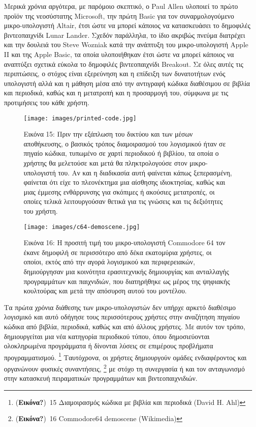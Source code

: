 \documentclass[
]{article}
\begin{document}
Μερικά χρόνια αργότερα, με παρόμοιο σκεπτικό, ο Paul Allen υλοποιεί το
πρώτο προϊόν της νεοσύστατης Microsoft, την πρώτη Basic για τον
συναρμολογούμενο μικρο-υπολογιστή Altair, έτσι ώστε να μπορεί κάποιος να
κατασκευάσει το δημοφιλές βιντεοπαιχνίδι Lunar Lander. Σχεδόν παράλληλα,
το ίδιο ακριβώς πνεύμα διατρέχει και την δουλειά του Steve Wozniak κατά
την ανάπτυξη του μικρο-υπολογιστή Apple II και της Apple Basic, τα οποία
υλοποιήθηκαν έτσι ώστε να μπορεί κάποιος να αναπτύξει σχετικά εύκολα το
δημοφιλές βιντεοπαιχνίδι Breakout. Σε όλες αυτές τις περιπτώσεις, ο
στόχος είναι εξερεύνηση και η επίδειξη των δυνατοτήτων ενός υπολογιστή
αλλά και η μάθηση μέσα από την αντιγραφή κώδικα διαθέσιμου σε βιβλία και
περιοδικά, καθώς και η μετατροπή και η προσαρμογή του, σύμφωνα με τις
προτιμήσεις του κάθε χρήστη.

\leavevmode{}%
\begin{figure}
\hypertarget{fig:printed-code}{%
\centering
\texttt{[image: images/printed-code.jpg]}
\caption{Εικόνα 15: Πριν την εξάπλωση του δικτύου και των μέσων
αποθήκευσης, ο βασικός τρόπος διαμοιρασμού του λογισμικού ήταν σε πηγαίο
κώδικα, τυπωμένο σε χαρτί περιοδικού ή βιβλίου, τα οποία ο χρήστης θα
μελετούσε και μετά θα πληκτρολογούσε στον μικρο-υπολογιστή του. Αν και η
διαδικασία αυτή φαίνεται κάπως ξεπερασμένη, φαίνεται ότι είχε το
πλεονέκτημα μια αίσθησης ιδιοκτησίας, καθώς και μιας έμμεσης ενθάρρυνσης
για σκόπιμες ή ακούσιες μετατροπές, οι οποίες τελικά λειτουργούσαν
θετικά για τις γνώσεις και τις δεξιότητες του
χρήστη.}\label{fig:printed-code}
}
\end{figure}

\leavevmode{}%
\begin{figure}
\hypertarget{fig:c64-demoscene}{%
\centering
\texttt{[image: images/c64-demoscene.jpg]}
\caption{Εικόνα 16: Η προσιτή τιμή του μικρο-υπολογιστή Commodore 64 τον
έκανε δημοφιλή σε περισσότερο από δέκα εκατομύρια χρήστες, οι οποίοι,
εκτός από την αγορά λογισμικού και περιφερειακών, δημιούργησαν μια
κοινότητα ερασιτεχνικής δημιουργίας και ανταλλαγής προγραμμάτων και
παιχνιδιών, που διατηρήθηκε ως μέρος της ψηφιακής κουλτούρας και μετά
την απόσυρση αυτού του μοντέλου.}\label{fig:c64-demoscene}
}
\end{figure}

Τα πρώτα χρόνια διάθεσης των μικρο-υπολογιστών δεν υπήρχε αρκετό
διαθέσιμο λογισμικό και αυτό οδήγησε τους περισσότερους χρήστες στην
αναζήτηση πηγαίου κώδικα από βιβλία, περιοδικά, καθώς και από άλλους
χρήστες. Με αυτόν τον τρόπο, δημιουργείται μια νέα κατηγορία περιοδικού
τύπου, όπου δημοσιεύονται ολοκληρωμένα προγράμματα ή δίνονται λύσεις σε
επιμέρους προβλήματα προγραμματισμού. \footnote{(\textbf{Εικόνα?})~15
  Διαμοιρασμός κώδικα με βιβλία και περιοδικά (David H. Ahl)}
Ταυτόχρονα, οι χρήστες δημιουργούν ομάδες ενδιαφέροντος και οργανώνουν
φυσικές συναντήσεις, \footnote{(\textbf{Εικόνα?})~16 Commodore64
  demoscene (Wikimedia)} με στόχο τη συνεργασία ή και τον ανταγωνισμό
στην κατασκευή πειραματικών προγραμμάτων και βιντεοπαιχνιδιών.
\end{document}
